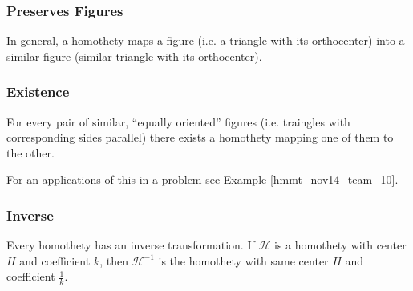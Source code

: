\documentclass[11pt,twoside]{scrartcl}
\begin{document}
\subsubsection{Preserves Figures}
In general, a homothety maps a figure (i.e. a triangle with its orthocenter) into a similar figure (similar triangle with its orthocenter).

\subsubsection{Existence}
For every pair of similar, ``equally oriented'' figures (i.e. traingles with corresponding sides parallel) there exists a homothety mapping one of them to the other.

\begin{note}
    For an applications of this in a problem see Example \ref{hmmt_nov14_team_10}.
\end{note}

\subsubsection{Inverse}
Every homothety has an inverse transformation. If $\mathcal{H}$ is a homothety with center $H$ and coefficient $k$, then $\mathcal{H}^{-1}$ is the homothety with same center $H$ and coefficient $\frac{1}{k}$.
\end{document}
